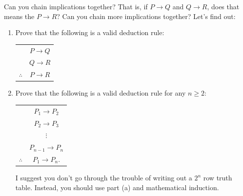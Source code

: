 \documentclass[10pt,]{book}
\theoremstyle{plain}
\theoremstyle{definition}
\theoremstyle{definition}
\theoremstyle{definition}
\theoremstyle{definition}
\numberwithin{equation}{chapter}
\newcommand{\hrulethin}  {\noalign{\hrule height 0.04em}}
\def\imp{\rightarrow}
\begin{document}
\begin{divisionexercise}{13}\hypertarget{exercise-232}{}
\hypertarget{p-1889}{}%
Can you chain implications together? That is, if \(P \imp Q\) and \(Q \imp R\), does that means the \(P \imp R\)? Can you chain more implications together? Let's find out:%
\par
\hypertarget{p-1890}{}%
\leavevmode%
\begin{enumerate}[label=(\alph*)]
\item\hypertarget{li-661}{}\hypertarget{p-1891}{}%
Prove that the following is a valid deduction rule:%
\begin{sidebyside}{1}{0}{0}{0}
\begin{sbspanel}{1}
{\centering%
\begin{tabular}{cc}
&\(P \imp Q\)\tabularnewline[0pt]
&\(Q \imp R\)\tabularnewline\hrulethin
\(\therefore\)&\(P \imp R\)
\end{tabular}
\par}
\end{sbspanel}
\end{sidebyside}
\item\hypertarget{li-662}{}\hypertarget{p-1892}{}%
Prove that the following is a valid deduction rule for any \(n \ge 2\):%
\begin{sidebyside}{1}{0}{0}{0}
\begin{sbspanel}{1}
{\centering%
\begin{tabular}{cc}
&\(P_1 \imp P_2\)\tabularnewline[0pt]
&\(P_2 \imp P_3\)\tabularnewline[0pt]
&\(\vdots\)\tabularnewline[0pt]
&\(P_{n-1} \imp P_n\)\tabularnewline\hrulethin
\(\therefore\)&\(P_1 \imp P_n\).
\end{tabular}
\par}
\end{sbspanel}
\end{sidebyside}
\par
\hypertarget{p-1893}{}%
I suggest you don't go through the trouble of writing out a \(2^n\) row truth table. Instead, you should use part (a) and mathematical induction. %
\end{enumerate}
%
\end{divisionexercise}%
\end{document}
